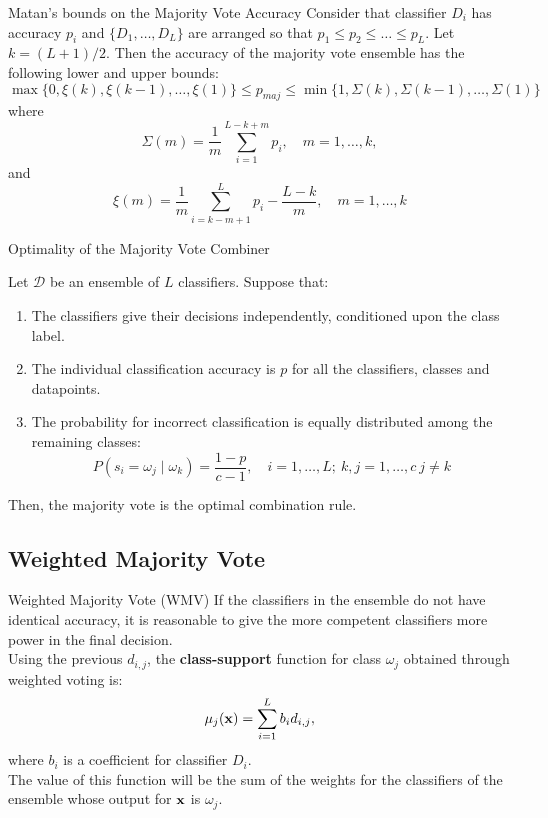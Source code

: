 \documentclass[xcolor=table]{beamer}
\begin{document}
\begin{frame}{Matan's bounds on the Majority Vote Accuracy}
        Consider that classifier \(D_i\) has accuracy \(p_i\) and \(\{D_1,\dots,D_L\}\) are arranged so that \(p_1\leq p_2\leq \dots \leq p_L\). Let \(k = (L+1)/2\). Then the accuracy of the majority vote ensemble has the following lower and upper bounds:
        \[
           \max \{0, \xi(k),\xi(k-1),\dots,\xi(1)\}\leq p_{maj} \leq \min \{ 1, \Sigma(k),\Sigma(k-1),\dots, \Sigma(1)\}
            \]
            where
            \[
            \Sigma(m) = \frac{1}{m}\sum_{i=1}^{L-k+m}p_i, \quad m = 1,\dots,k,
            \]
            and
            \[
            \xi(m) = \frac{1}{m} \sum_{i=k-m+1}^L p_i - \frac{L-k}{m},\quad m=1,\dots,k
            \]

\end{frame}

\begin{frame}{Optimality of the Majority Vote Combiner}
    \begin{theorem}
        Let \(\mathbf{\mathcal D}\) be an ensemble of \(L\) classifiers. Suppose that:
        \begin{enumerate}
            \item The classifiers give their decisions independently, conditioned upon the class label.
            \item The individual classification accuracy is \(p\) for all the classifiers, classes and datapoints.
            \item The probability for incorrect classification is equally distributed among the remaining classes:
            \[
            P(s_i = \omega_j \mid \omega_k) = \frac{1-p}{c-1}, \quad i =1,\dots,L; \ k,j = 1,\dots,c \ j \neq k
            \]
        \end{enumerate}
        Then, the majority vote is the optimal combination rule.
    \end{theorem}
\end{frame}


\subsection{Weighted Majority Vote }

\begin{frame}{Weighted Majority Vote (WMV)}
    If the classifiers in the ensemble do not have identical accuracy, it is reasonable to give the more competent classifiers more power in the final decision. \\
    Using the previous \(d_{i,j}\), the \textbf{class-support} function for class \(\omega_j\) obtained through weighted voting is:
    \[
    \mu_j({\mathbf x}) = \sum_{i=1}^L b_i d_{i,j},
    \]
    where \(b_i\) is a coefficient for classifier \(D_i\).\\

    The value of this function will be the sum of the weights for the classifiers of the ensemble whose output for \({\mathbf x}\) is \(\omega_j\).
\end{frame}
\end{document}
